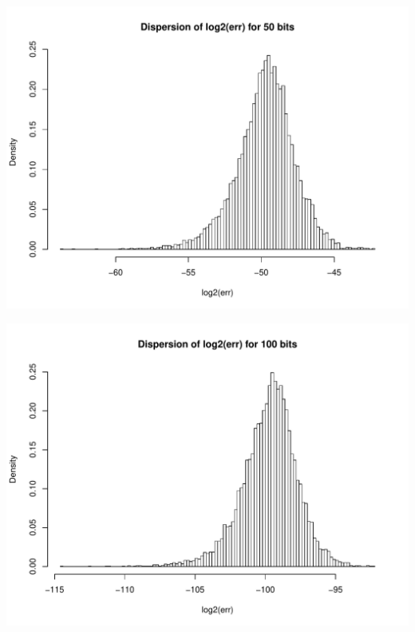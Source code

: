 \documentclass[serif, 12pt]{beamer}
\begin{document}

\begin{frame}

\begin{adjustwidth}{-2em}{-2em}
\centering
\includegraphics[width=\linewidth]{../../src/err50.pdf}
\end{adjustwidth}

\end{frame}


\begin{frame}

\begin{adjustwidth}{-2em}{-2em}
\centering
\includegraphics[width=\linewidth]{../../src/err100.pdf}
\end{adjustwidth}

\end{frame}
\end{document}
